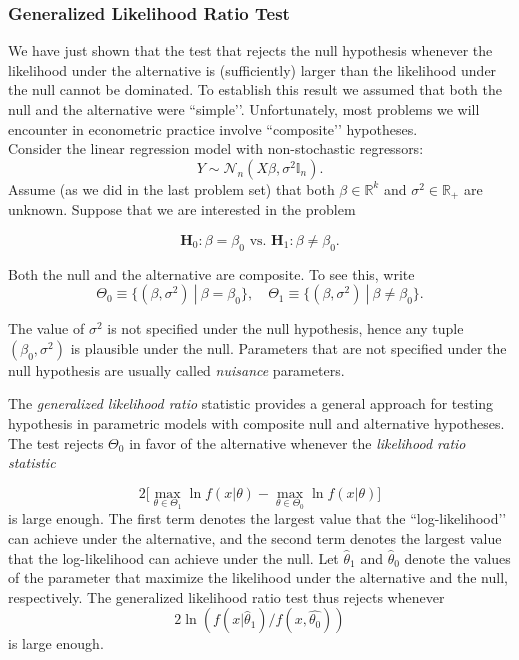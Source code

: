 \documentclass[11pt]{article} %
\begin{document}
\subsubsection{Generalized Likelihood Ratio Test}

We have just shown that the test that rejects the null hypothesis whenever the likelihood under the alternative is (sufficiently) larger than the likelihood under the null cannot be dominated. To establish this result we assumed that both the null and the alternative were ``simple’’. Unfortunately, most problems we will encounter in econometric practice involve ``composite’’ hypotheses.  \\

 Consider the linear regression model with non-stochastic regressors:
\begin{equation}
Y \sim \mathcal{N}_n(X \beta, \sigma^2 \mathbb{I}_n ).
\end{equation}
Assume (as we did in the last problem set) that both $\beta \in \mathbb{R}^{k}$ and $\sigma^2 \in \mathbb{R}_{+}$ are unknown. Suppose that we are interested in the problem

\begin{equation}\label{equation:Hypothesis}
\textbf{H}_0: \beta=\beta_0 \textrm{ vs. }  \textbf{H}_1: \beta \neq \beta_0. 
\end{equation}

\noindent Both the null and the alternative  are composite. To see this, write
\[ \Theta_0 \equiv \{ (\beta, \sigma^2) \: | \: \beta = \beta_0 \}, \quad \Theta_1 \equiv \{ (\beta, \sigma^2) \: | \: \beta \neq \beta_0 \}.\]

\noindent The value of $\sigma^2$ is not specified under the null hypothesis, hence any tuple $(\beta_0, \sigma^2)$ is plausible under the null. Parameters that are not specified under the null hypothesis are usually called \emph{nuisance} parameters.

The \emph{generalized likelihood ratio} statistic provides a general approach for testing hypothesis in parametric models with composite null and alternative hypotheses. The test rejects $\Theta_0$ in favor of the alternative whenever the \emph{likelihood ratio statistic}

\begin{equation}
2\Big [  \max_{\theta \in \Theta_1} \ln f(x | \theta) - \max_{\theta \in \Theta_0} \ln f(x | \theta) \Big ]
\end{equation}
is large enough. The first term denotes the largest value that the ``log-likelihood’’ can achieve under the alternative, and the second term denotes the largest value that the log-likelihood can achieve under the null. Let $\widehat{\theta}_1$ and $\widehat{\theta}_0$ denote the values of the parameter that maximize the likelihood under the alternative and the null, respectively. The generalized likelihood ratio test thus rejects whenever
\[ 2 \ln \left(  f(x | \widehat{\theta}_1) / f(x, \widehat{\theta_0}) \right) \]
is large enough. \\
\end{document}
